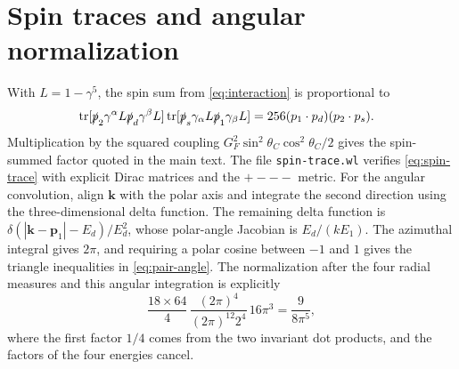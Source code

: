 \section{Spin traces and angular normalization}
\label{app:normalization}
With \(L=1-\gamma^5\), the spin sum from \cref{eq:interaction} is proportional to
\begin{align}
 &\operatorname{tr}[\slashed p_2\gamma^\alpha L\slashed p_d\gamma^\beta L]
 \operatorname{tr}[\slashed p_s\gamma_\alpha L\slashed p_1\gamma_\beta L]
 =256(p_1\cdot p_d)(p_2\cdot p_s).
 \label{eq:spin-trace}
\end{align}
Multiplication by the squared coupling \(G_F^2\sin^2\theta_C\cos^2\theta_C/2\) gives the spin-summed factor quoted in the main text.
The file \texttt{spin-trace.wl} verifies \cref{eq:spin-trace} with explicit Dirac matrices and the \(+---\) metric.
For the angular convolution, align \(\bm k\) with the polar axis and integrate the second direction using the three-dimensional delta function.
The remaining delta function is \(\delta(|\bm k-\bm p_1|-E_d)/E_d^2\), whose polar-angle Jacobian is \(E_d/(kE_1)\).
The azimuthal integral gives \(2\pi\), and requiring a polar cosine between \(-1\) and \(1\) gives the triangle inequalities in \cref{eq:pair-angle}.
The normalization after the four radial measures and this angular integration is explicitly
\begin{equation}
 \frac{18\times64}{4}\,
 \frac{(2\pi)^4}{(2\pi)^{12}2^4}\,16\pi^3
 =\frac{9}{8\pi^5},
 \label{eq:normalization-arithmetic}
\end{equation}
where the first factor \(1/4\) comes from the two invariant dot products, and the factors of the four energies cancel.

